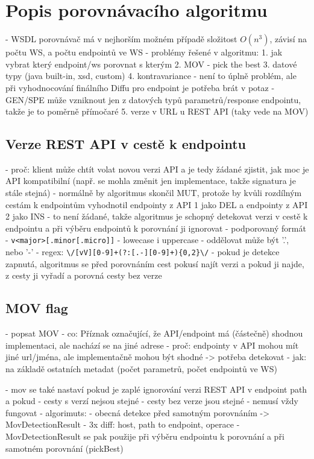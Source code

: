 \documentclass[czech,DP]{thesiskiv}
\begin{document}
\section{Popis porovnávacího algoritmu}
- WSDL porovnávač má v nejhorším možném případě složitost $O(n^3)$, závisí na počtu WS, a počtu endpointů ve WS 
- problémy řešené v algoritmu:
	1. jak vybrat který endpoint/ws porovnat s kterým
	2. MOV - pick the best
	3. datové typy (java built-in, xsd, custom)
	4. kontravariance
		- není to úplně problém, ale při vyhodnocování finálního Diffu pro endpoint je potřeba brát v potaz 
		- GEN/SPE může vzniknout jen z datových typů parametrů/response endpointu, takže je to poměrně přímočaré
	5. verze v URL u REST API (taky vede na MOV)
	
\subsection{Verze REST API v cestě k endpointu}	

- proč: klient může chtít volat novou verzi API a je tedy žádané zjistit, jak moc je API kompatibilní (např. se mohla změnit jen implementace, takže signatura je stále stejná)
- normálně by algoritmus skončil MUT, protože by kvůli rozdílným cestám k endpointům vyhodnotil endpointy z API 1 jako DEL a endpointy z API 2 jako INS
- to není žádané, takže algoritmus je schopný detekovat verzi v cestě k endpointu a při výběru endpointů k porovnání ji ignorovat
- podporovaný formát
	- \verb|v<major>[.minor[.micro]]|
	- lowecase i uppercase
	- oddělovat může být '.', nebo '-'
	- regex: \verb|\/[vV][0-9]+(?:[.-][0-9]+){0,2}\/|
- pokud je detekce zapnutá, algoritmus se před porovnáním cest pokusí najít verzi a pokud ji najde, z cesty ji vyřadí a porovná cesty bez verze
	
\subsection{MOV flag}	

- popsat MOV
- co: Příznak označující, že API/endpoint má (částečně) shodnou implementaci, ale nachází se na jiné adrese
- proč: endpointy v API mohou mít jiné url/jména, ale implementačně mohou být shodné -> potřeba detekovat
- jak: na základě ostatních metadat (počet parametrů, počet endpointů ve WS)

- mov se také nastaví pokud je zaplé ignorování verzi REST API v endpoint path a pokud 
	- cesty s verzí nejsou stejné
	- cesty bez verze jsou stejné
- nemusí vždy fungovat
- algorimuts:
	- obecná detekce před samotným porovnáním -> MovDetectionResult
		- 3x diff: host, path to endpoint, operace
	- MovDetectionResult se pak použije při výběru endpointu k porovnání a při samotném porovnání (pickBest)
	
\end{document}
